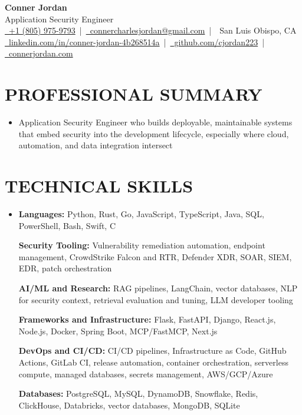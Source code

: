 \documentclass[letterpaper,10pt]{article}
\newcommand{\resumeSubHeadingListStart}{\begin{itemize}[leftmargin=0in,label={}]}
\newcommand{\resumeSubHeadingListEnd}{\end{itemize}}
\begin{document}
\begin{center}
  {\Huge \textbf{Conner Jordan}}\\[0pt]
  {\Large Application Security Engineer}\\[0pt]
  \href{tel:+18059759793}{\faPhone\ +1 (805) 975-9793} \,|\, 
  \href{mailto:connercharlesjordan@gmail.com}{\faEnvelope\ connercharlesjordan@gmail.com} \,|\, 
  \faMapMarker\ San Luis Obispo, CA \\[-2pt]
  \href{https://www.linkedin.com/in/conner-jordan-4b268514a/}{\faLinkedin\ linkedin.com/in/conner-jordan-4b268514a}
  \,|\, \href{https://github.com/cjordan223}{\faGithub\ github.com/cjordan223}
  \,|\, \href{https://connerjordan.com/}{\faGlobe\ connerjordan.com}
\end{center}

\vspace{4pt}

\section{PROFESSIONAL SUMMARY}
\vspace{8pt}
\resumeSubHeadingListStart
\item {\small
Application Security Engineer who builds deployable, maintainable systems that embed security into the development lifecycle, especially where cloud, automation, and data integration intersect}
\resumeSubHeadingListEnd
\vspace{6pt}

\section{TECHNICAL SKILLS}
\vspace{6pt}
\resumeSubHeadingListStart
\item {\small
\textbf{Languages:} Python, Rust, Go, JavaScript, TypeScript, Java, SQL, PowerShell, Bash, Swift, C

\vspace{3pt}
\textbf{Security Tooling:} Vulnerability remediation automation, endpoint management, CrowdStrike Falcon and RTR, Defender XDR, SOAR, SIEM, EDR, patch orchestration

\vspace{3pt}
\textbf{AI/ML and Research:} RAG pipelines, LangChain, vector databases, NLP for security context, retrieval evaluation and tuning, LLM developer tooling

\vspace{3pt}
\textbf{Frameworks and Infrastructure:} Flask, FastAPI, Django, React.js, Node.js, Docker, Spring Boot, MCP/FastMCP, Next.js

\vspace{3pt}
\textbf{DevOps and CI/CD:} CI/CD pipelines, Infrastructure as Code, GitHub Actions, GitLab CI, release automation, container orchestration, serverless compute, managed databases, secrets management, AWS/GCP/Azure

\vspace{3pt}
\textbf{Databases:} PostgreSQL, MySQL, DynamoDB, Snowflake, Redis, ClickHouse, Databricks, vector databases, MongoDB, SQLite
}
\resumeSubHeadingListEnd
\vspace{6pt}
\end{document}
